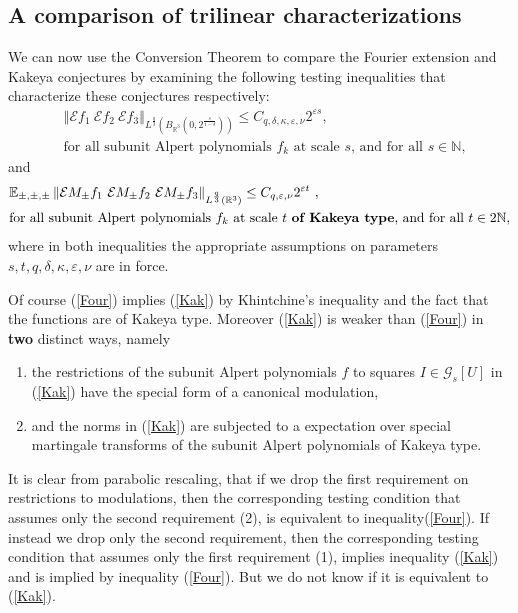 \documentclass{amsart}%
\theoremstyle{plain}
\numberwithin{equation}{section}
\begin{document}
\subsection{A comparison of trilinear characterizations}

We can now use the Conversion Theorem to compare the Fourier extension and
Kakeya conjectures by examining the following testing inequalities that
characterize these conjectures respectively:%
\begin{align}
& \left\Vert \mathcal{E}f_{1}\ \mathcal{E}f_{2}\ \mathcal{E}f_{3}\right\Vert
_{L^{\frac{q}{3}}\left(  B_{\mathbb{R}^{3}}\left(  0,2^{\frac{s}{1-\delta}%
}\right)  \right)  }\leq C_{q,\delta,\kappa,\varepsilon,\nu}2^{\varepsilon
s},\label{Four}\\
& \text{for all subunit Alpert polynomials }f_{k}\text{ at scale }s\text{, and
for all }s\in\mathbb{N},\nonumber
\end{align}
and%
\begin{align}
& \mathbb{E}_{\pm,\pm,\pm}\left\Vert \mathcal{E}M_{\pm}f_{1}\ \mathcal{E}%
M_{\pm}f_{2}\ \mathcal{E}M_{\pm}f_{3}\right\Vert _{L^{\frac{q}{3}}\left(
\mathbb{R}^{3}\right)  }\leq C_{q,\varepsilon,\nu}2^{\varepsilon
t}\ ,\label{Kak}\\
& \text{for all subunit Alpert polynomials }f_{k}\text{ at scale }t\text{
\textbf{of Kakeya type}, and for all }t\in2\mathbb{N},\nonumber
\end{align}
where in both inequalities the appropriate assumptions on parameters
$s,t,q,\delta,\kappa,\varepsilon,\nu$ are in force.

Of course (\ref{Four}) implies (\ref{Kak}) by Khintchine's inequality and the
fact that the functions are of Kakeya type. Moreover (\ref{Kak}) is weaker
than (\ref{Four}) in \textbf{two} distinct ways, namely

\begin{enumerate}
\item the restrictions of the subunit Alpert polynomials $f$ to squares
$I\in\mathcal{G}_{s}\left[  U\right]  $ in (\ref{Kak}) have the special form
of a canonical modulation,

\item and the norms in (\ref{Kak}) are subjected to a expectation over special
martingale transforms of the subunit Alpert polynomials of Kakeya type.
\end{enumerate}

It is clear from parabolic rescaling, that if we drop the first requirement on
restrictions to modulations, then the corresponding testing condition that
assumes only the second requirement (2), is equivalent to
inequality(\ref{Four}). If instead we drop only the second requirement, then
the corresponding testing condition that assumes only the first requirement
(1), implies inequality (\ref{Kak}) and is implied by inequality (\ref{Four}).
But we do not know if it is equivalent to (\ref{Kak}).
\end{document}
